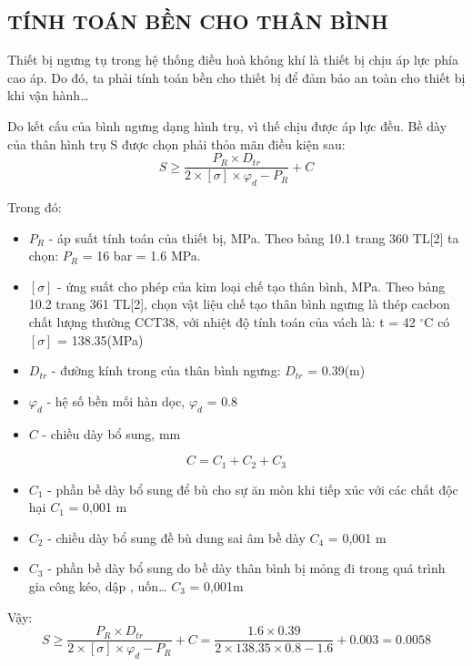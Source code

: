 \subsection{TÍNH TOÁN BỀN CHO THÂN BÌNH}
Thiết bị ngưng tụ trong hệ thống điều hoà không khí là thiết bị chịu áp lực phía cao áp. Do đó, ta phải tính toán bền cho thiết bị để đảm bảo an toàn cho thiết bị khi vận hành…

Do kết cấu của bình ngưng dạng hình trụ, vì thế chịu được áp lực đều. Bề dày của thân hình trụ S được chọn phải thỏa mãn điều kiện sau:
\begin{equation*}
	S \geq \dfrac{P_{R}\times D_{tr}}{2\times [\sigma]\times\varphi_{d} - P_{R}} + C
\end{equation*}

Trong đó:
\begin{itemize}
	\item $P_{R}$ - áp suất tính toán của thiết bị, MPa. Theo bảng 10.1 trang 360 TL[2] ta chọn: $P_{R}$ = 16 bar = 1.6 MPa.
	\item $[\sigma]$ - ứng suất cho phép của kim loại chế tạo thân bình, MPa. Theo bảng 10.2 trang 361 TL[2], chọn vật liệu chế tạo thân bình ngưng là thép cacbon chất lượng thường CCT38, với nhiệt độ tính toán của vách là: t = 42 $^{\circ}$C có $[\sigma]$ = 138.35(MPa)
	\item $D_{tr}$ - đường kính trong của thân bình ngưng: $D_{tr}$ = 0.39(m)
	\item $\varphi_{d}$ - hệ số bền mối hàn dọc, $\varphi_{d}$ = 0.8
	\item $C$ - chiều dày bổ sung, mm
\end{itemize}
\begin{equation*}
	C = C_{1} + C_{2} + C_{3}
\end{equation*}
\begin{itemize}
	\item $C_{1}$ - phần bề dày bổ sung để bù cho sự ăn mòn khi tiếp xúc với các	chất độc hại $C_{1}$ = 0,001 m
	\item $C_{2}$ - chiều dày bổ sung đề bù dung sai âm bề dày $C_{4}$ = 0,001 m
	\item $C_{3}$ - phần bề dày bổ sung do bề dày thân bình bị mỏng đi trong quá trình gia công kéo, dập , uốn… $C_{3}$ = 0,001m
\end{itemize}

Vậy:
\begin{equation*}
	S \geq \dfrac{P_{R}\times D_{tr}}{2\times [\sigma]\times\varphi_{d} - P_{R}} + C =\dfrac{1.6 \times 0.39}{2 \times 138.35 \times 0.8 - 1.6} + 0.003 = 0.0058
\end{equation*}

